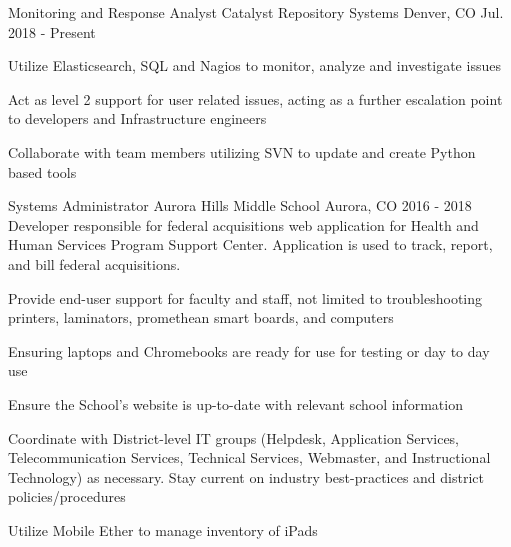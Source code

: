 

\begin{cventries}

  \cventrysix
    {Monitoring and Response ​Analyst} %
    {Catalyst Repository Systems} %
    {Denver, CO} %
    {Jul. 2018 - Present} %
    {} %
    {
      \begin{cvitems} %
        \item {Utilize Elasticsearch, SQL and Nagios to monitor, analyze and investigate issues}
        \item {Act as level 2 support for user related issues, acting as a further escalation point to developers and Infrastructure engineers}
        \item {Collaborate with team members utilizing SVN to update and create Python based tools}
      \end{cvitems}
    }

  \cventrysix
    {Systems Administrator} %
    {Aurora Hills Middle School} %
    {Aurora, CO} %
    {2016 - 2018} %
    {Developer responsible for federal acquisitions web application for Health and Human Services Program Support Center. Application is used to track, report, and bill federal acquisitions.} %
    {
      \begin{cvitems} %
        \item {Provide end-user support for faculty and staff, not limited to troubleshooting printers, laminators, promethean smart boards, and computers}
        \item {Ensuring laptops and Chromebooks are ready for use for testing or day to day use}
        \item {Ensure the School’s website is up-to-date with relevant school information}
        \item {Coordinate with District-level IT groups (Helpdesk, Application Services, Telecommunication Services, Technical Services, Webmaster, and Instructional Technology) as necessary. Stay current on industry best-practices and district policies/procedures}
        \item {Utilize Mobile Ether to manage inventory of iPads}
      \end{cvitems}
    }


\end{cventries}
